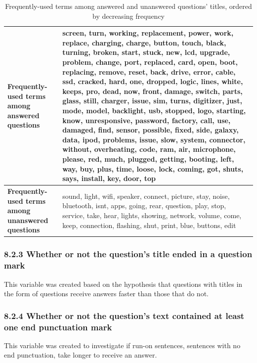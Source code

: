 \documentclass{article}
\begin{document}
\begin{table}[!htbp]
\centering
\begin{tabular}{|p{4cm}|p{8cm}|}
  \hline
 \textbf{Frequently-used terms among answered questions} & screen, turn, working, replacement, power, work, replace, charging, charge, button, touch, black, turning, broken, start, stuck, new, lcd, upgrade, problem, change, port, replaced, card, open, boot, replacing, remove, reset, back, drive, error, cable, ssd, cracked, hard, one, dropped, logic, lines, white, keeps, pro, dead, now, front, damage, switch, parts, glass, still, charger, issue, sim, turns, digitizer, just, mode, model, backlight, usb, stopped, logo, starting, know, unresponsive, password, factory, call, use, damaged, find, sensor, possible, fixed, side, galaxy, data, ipod, problems, issue, slow, system, connector, without, overheating, code, ram, air, microphone, please, red, much, plugged, getting, booting, left, way, buy, plus, time, loose, lock, coming, got, shuts, says, install, key, door, top \\
  \hline
  \textbf{Frequently-used terms among unanswered questions} & sound, light, wifi, speaker, connect, picture, stay, noise, bluetooth, isnt, apps, going, rear, question, play, stop, service, take, hear, lights, showing, network, volume, come, keep, connection, flashing, shut, print, blue, buttons, edit \\ 
   \hline
\end{tabular}
\caption{Frequently-used terms among answered and unanswered questions' titles, ordered by decreasing frequency}
\label{table:frequent_terms}
\end{table}

\subsubsection*{8.2.3 Whether or not the question's title ended in a question mark}

This variable was created based on the hypothesis that questions with titles in the form of questions receive answers faster than those that do not.

\subsubsection*{8.2.4 Whether or not the question's text contained at least one end punctuation mark}

This variable was created to investigate if run-on sentences, sentences with no end punctuation, take longer to receive an answer.
\end{document}

